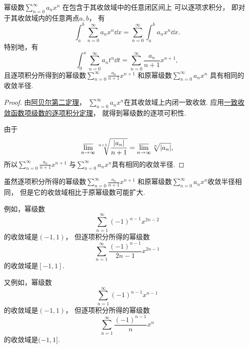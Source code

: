 \begin{property}\label{theorem:无穷级数.幂级数的和函数的性质2}
幂级数\(\sum_{n=0}^\infty a_n x^n\)
在包含于其收敛域中的任意闭区间上
可以逐项求积分，
即对于其收敛域内的任意两点\(a,b\)，
有\begin{equation}
	\int_a^b \sum_{n=0}^\infty a_n x^n \dd{x}
	= \sum_{n=0}^\infty \int_a^b a_n x^n \dd{x}.
\end{equation}
特别地，有\begin{equation}
	\int_0^x \sum_{n=0}^\infty a_n t^n \dd{t}
	= \sum_{n=0}^\infty \frac{a_n}{n+1} x^{n+1},
\end{equation}
且逐项积分所得到的幂级数\(\sum_{n=0}^\infty \frac{a_n}{n+1} x^{n+1}\)
和原幂级数\(\sum_{n=0}^\infty a_n x^n\)
具有相同的收敛半径.
\begin{proof}
由\hyperref[theorem:无穷级数.阿贝尔定理2]{阿贝尔第二定理}，
\(\sum_{n=0}^\infty a_n x^n\)在其收敛域上内闭一致收敛.
应用\hyperref[theorem:函数项级数.连续函数项级数的一致收敛性保证和函数的可积性]{一致收敛函数项级数的逐项积分定理}，
就得到幂级数的逐项可积性.

由于\[
	\varlimsup_{n\to\infty} \sqrt[n+1]{\frac{\abs{a_n}}{n+1}}
	= \varlimsup_{n\to\infty} \sqrt[n]{\abs{a_n}},
\]
所以\(\sum_{n=0}^\infty \frac{a_n}{n+1} x^{n+1}\)
与\(\sum_{n=0}^\infty a_n x^n\)具有相同的收敛半径.
\end{proof}
\end{property}
\begin{remark}
虽然逐项积分所得的幂级数\(\sum_{n=0}^\infty \frac{a_n}{n+1} x^{n+1}\)
和原幂级数\(\sum_{n=0}^\infty a_n x^n\)收敛半径相同，
但是它的收敛域相比于原幂级数可能扩大.

例如，幂级数\[
	\sum_{n=1}^\infty (-1)^{n-1} x^{2n-2}
\]的收敛域是\((-1,1)\)，
但逐项积分所得的幂级数\[
	\sum_{n=1}^\infty \frac{(-1)^{n-1}}{2n-1} x^{2n-1}
\]的收敛域是\([-1,1]\).

又例如，幂级数\[
	\sum_{n=1}^\infty (-1)^{n-1} x^{n-1}
\]的收敛域是\((-1,1)\)，
但逐项积分所得的幂级数\[
	\sum_{n=1}^\infty \frac{(-1)^{n-1}}{n} x^n
\]的收敛域是\((-1,1]\).
\end{remark}

